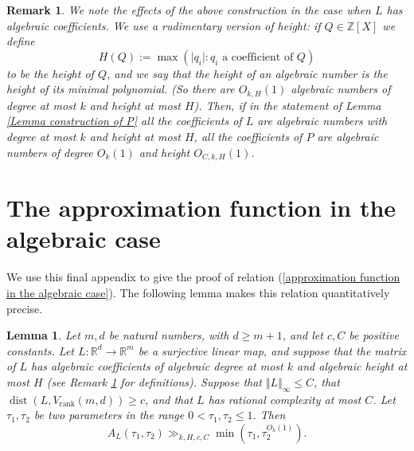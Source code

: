 \documentclass[12pt,a4paper,twoside,reqno]{amsart}
\newtheorem{Lemma}[Theorem]{Lemma}
\newtheorem{Remark}[Theorem]{Remark}
\newcommand{\rank}{\operatorname{rank}}
\newcommand{\dist}{\operatorname{dist}}
\numberwithin{equation}{section}
\begin{document}
\begin{Remark}
\label{Remark about P}
\emph{We note the effects of the above construction in the case when $L$ has algebraic coefficients. We use a rudimentary version of height: if $Q\in \mathbb{Z}[X]$ we define \[H(Q):= \max(\vert q_i\vert: q_i\text{ a coefficient of }  Q)\] to be the \emph{height} of $Q$, and we say that the height of an algebraic number is the height of its minimal polynomial. (So there are $O_{k,H}(1)$ algebraic numbers of degree at most $k$ and height at most $H$). Then, if in the statement of Lemma \ref{Lemma construction of P} all the coefficients of $L$ are algebraic numbers with degree at most $k$ and height at most $H$, all the coefficients of $P$ are algebraic numbers of degree $O_{k}(1)$ and height $O_{C,k,H}(1)$.}
\end{Remark}

\section{The approximation function in the algebraic case}
\label{section algebraic approximation}
We use this final appendix to give the proof of relation (\ref{approximation function in the algebraic case}). The following lemma makes this relation quantitatively precise. 

\begin{Lemma}
\label{Lemma algebraic coeffs implies gen appr}
Let $m,d$ be natural numbers, with $d\geqslant m+1$, and let $c,C$ be positive constants. Let $L:\mathbb{R}^d \longrightarrow \mathbb{R}^m$ be a surjective linear map, and suppose that the matrix of $L$ has algebraic coefficients of algebraic degree at most $k$ and algebraic height at most $H$ (see Remark \ref{Remark about P} for definitions). Suppose that $\Vert L\Vert_\infty \leqslant C$, that $\dist(L,V_{\rank}(m,d)) \geqslant c$, and that $L$ has rational complexity at most $C$. Let $\tau_1,\tau_2$ be two parameters in the range $0<\tau_1,\tau_2\leqslant 1$. Then \[ A_L(\tau_1,\tau_2) \gg_{k,H,c,C} \min(\tau_1, \tau_2^{O_{k}(1)}).\] 
\end{Lemma}
\end{document}
